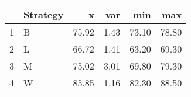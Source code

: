\begin{table}[ht]
\centering
\begin{tabular}{rlrrrr}
  \hline
 & Strategy & x & var & min & max \\ 
  \hline
1 & B & 75.92 & 1.43 & 73.10 & 78.80 \\ 
  2 & L & 66.72 & 1.41 & 63.20 & 69.30 \\ 
  3 & M & 75.02 & 3.01 & 69.80 & 79.30 \\ 
  4 & W & 85.85 & 1.16 & 82.30 & 88.50 \\ 
   \hline
\end{tabular}
\end{table}
